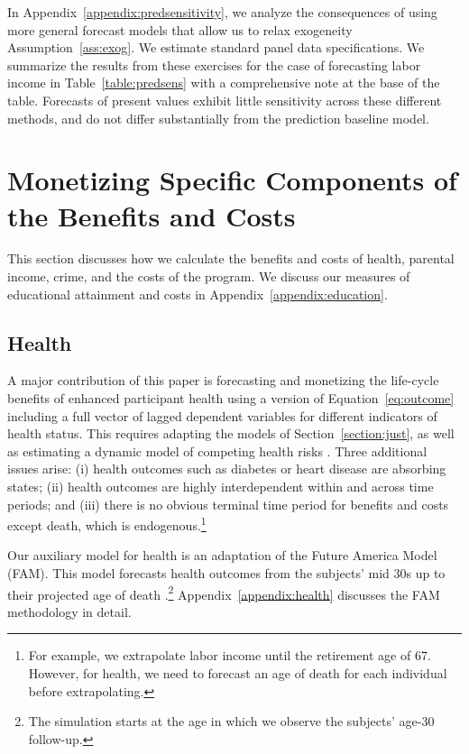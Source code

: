 In Appendix~\ref{appendix:predsensitivity}, we analyze the consequences of using more general forecast models that allow us to relax exogeneity Assumption~\ref{ass:exog}. We estimate standard panel data specifications. We summarize the results from these exercises for the case of forecasting labor income in Table~\ref{table:predsens} with a comprehensive note at the base of the table. Forecasts of present values exhibit little sensitivity across these different methods, and do not differ substantially from the prediction baseline model.

\section{Monetizing Specific Components of the Benefits and Costs}
\label{section:monetizing-benefits-costs}

This section discusses how we calculate the benefits and costs of health, parental income, crime, and the costs of the program. We discuss our measures of educational attainment and costs in Appendix~\ref{appendix:education}.

\subsection{Health} \label{section:health}

A major contribution of this paper is forecasting and monetizing the life-cycle benefits of enhanced participant health using a version of Equation~\eqref{eq:outcome} including a full vector of lagged dependent variables for different indicators of health status. This requires adapting the models of Section~\ref{section:just}, as well as estimating a dynamic model of competing health risks \citep{Kalbfleisch_Prentice_1980_failure}. Three additional issues arise: (i) health outcomes such as diabetes or heart disease are absorbing states; (ii) health outcomes are highly interdependent within and across time periods; and (iii) there is no obvious terminal time period for benefits and costs except death, which is endogenous.\footnote{For example, we extrapolate labor income until the retirement age of 67. However, for health, we need to forecast an age of death for each individual before extrapolating.}

Our auxiliary model for health is an adaptation of the Future America Model (FAM). This model forecasts health outcomes from the subjects' mid 30s up to their projected age of death \citep{Goldman_etal_2015_Future-Elderly-Model-Report}.\footnote{The simulation starts at the age in which we observe the subjects' age-30 follow-up.}  Appendix~\ref{appendix:health} discusses the FAM methodology in detail.

